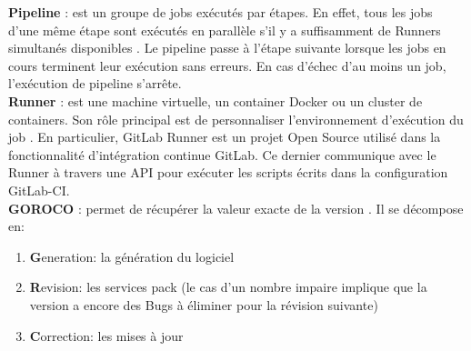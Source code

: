 \textbf{Pipeline}
: est un groupe de jobs exécutés par étapes. En effet, tous les jobs d’une même étape sont exécutés en parallèle s’il y a suffisamment de Runners simultanés disponibles \cite{ref4}.
Le pipeline passe à l’étape suivante lorsque les jobs en cours terminent leur exécution sans erreurs. En cas d’échec d’au moins un job, l'exécution de pipeline s'arrête.\\

\textbf{Runner}
 : est une machine virtuelle, un container Docker ou un cluster de containers. Son rôle principal est de personnaliser l’environnement d’exécution du job \cite{ref4}.
En particulier, GitLab Runner est un projet Open Source utilisé dans la fonctionnalité d’intégration continue GitLab. Ce dernier communique avec le Runner
à travers une API pour exécuter les scripts écrits dans la configuration GitLab-CI.
\\

\textbf{GOROCO}
 : permet de récupérer la valeur exacte de la version \cite{ref5}. Il se décompose en:
 \begin{enumerate}
     \item \textbf{G}eneration: la génération du logiciel
     \item \textbf{R}evision: les services pack (le cas d’un nombre impaire implique que la version a encore des Bugs à éliminer pour la révision suivante)
     \item \textbf{C}orrection: les mises à jour
 \end{enumerate}

 
 